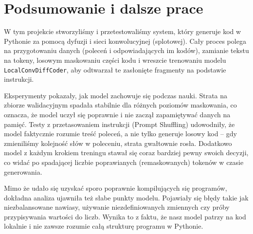 \section{Podsumowanie i dalsze prace}
\label{sec:podsumowanie}

W tym projekcie stworzyliśmy i przetestowaliśmy system, który generuje kod w Pythonie za pomocą dyfuzji i sieci konwolucyjnej (splotowej). Cały proces polega na przygotowaniu danych (poleceń i odpowiadających im kodów), zamianie tekstu na tokeny, losowym maskowaniu części kodu i wreszcie trenowaniu modelu \texttt{LocalConvDiffCoder}, aby odtwarzał te zasłonięte fragmenty na podstawie instrukcji.

Eksperymenty pokazały, jak model zachowuje się podczas nauki. Strata na zbiorze walidacyjnym spadała stabilnie dla różnych poziomów maskowania, co oznacza, że model uczył się poprawnie i nie zaczął zapamiętywać danych na pamięć. Testy z przetasowaniem instrukcji (Prompt Shuffling) udowodniły, że model faktycznie rozumie treść poleceń, a nie tylko generuje losowy kod – gdy zmieniliśmy kolejność słów w poleceniu, strata gwałtownie rosła. Dodatkowo model z każdym krokiem treningu stawał się coraz bardziej pewny swoich decyzji, co widać po spadającej liczbie poprawianych (remaskowanych) tokenów w czasie generowania.

Mimo że udało się uzyskać sporo poprawnie kompilujących się programów, dokładna analiza ujawniła też słabe punkty modelu. Pojawiały się błędy takie jak niezbalansowane nawiasy, używanie niezdefiniowanych zmiennych czy próby przypisywania wartości do liczb. Wynika to z faktu, że nasz model patrzy na kod lokalnie i nie zawsze rozumie całą strukturę programu w Pythonie.
